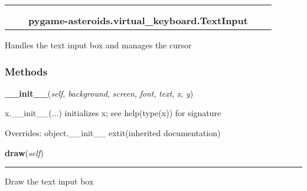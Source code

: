     \label{pygame-asteroids:virtual_keyboard:TextInput}
\begin{tabular}{cccccc}
\multicolumn{2}{r}{\settowidth{\BCL}{object}\multirow{2}{\BCL}{object}}
&&
  \\\cline{3-3}
  &&\multicolumn{1}{c|}{}
&&
  \\
&&\multicolumn{2}{l}{\textbf{pygame-asteroids.virtual\_keyboard.TextInput}}
\end{tabular}

Handles the text input box and manages the cursor



  \subsubsection{Methods}

    \vspace{0.5ex}

\hspace{.8\funcindent}\begin{boxedminipage}{\funcwidth}

    \raggedright \textbf{\_\_init\_\_}(\textit{self}, \textit{background}, \textit{screen}, \textit{font}, \textit{text}, \textit{x}, \textit{y})

\setlength{\parskip}{2ex}
    x.\_\_init\_\_(...) initializes x; see help(type(x)) for signature

\setlength{\parskip}{1ex}
      Overrides: object.\_\_init\_\_ 	extit{(inherited documentation)}

    \end{boxedminipage}

    \label{pygame-asteroids:virtual_keyboard:TextInput:draw}

    \vspace{0.5ex}

\hspace{.8\funcindent}\begin{boxedminipage}{\funcwidth}

    \raggedright \textbf{draw}(\textit{self})

    \vspace{-1.5ex}

    \rule{\textwidth}{0.5\fboxrule}
\setlength{\parskip}{2ex}
    Draw the text input box

\setlength{\parskip}{1ex}
    \end{boxedminipage}


